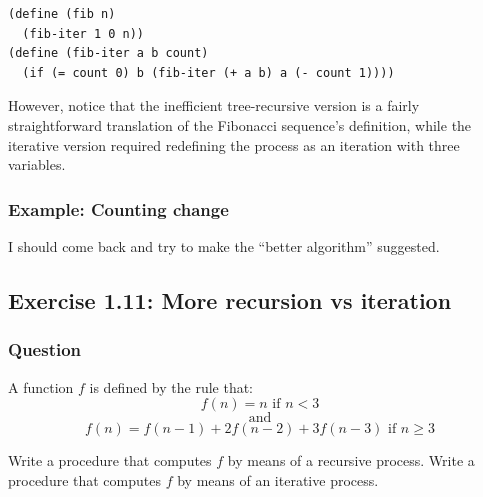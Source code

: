 \documentclass[final,fleqn,titlepage,twoside]{article}
\begin{document}
\begin{verbatim}
(define (fib n)
  (fib-iter 1 0 n))
(define (fib-iter a b count)
  (if (= count 0) b (fib-iter (+ a b) a (- count 1))))
\end{verbatim}

However, notice that the inefficient tree-recursive version is a fairly
straightforward translation of the Fibonacci sequence's definition, while the
iterative version required redefining the process as an iteration with three
variables.

\subsubsection{Example: Counting change}
\label{sec:org1ac6d2a}
I should come back and try to make the ``better algorithm'' suggested.

\subsection{Exercise 1.11: More recursion vs iteration}
\label{sec:org8dfcbf2}
\subsubsection{Question}
\label{sec:org7e5cbfd}
A function \(f\) is defined by the rule that:
\[
f(n)=n \text{ if } n<3
\]
\[
\text{ and }
\]
\[
f(n)=f(n-1)+2f(n-2)+3f(n-3) \text{ if } n \geq 3
\]

Write a procedure that computes \(f\) by means of a recursive process. Write a
procedure that computes \(f\) by means of an iterative process.
\end{document}

